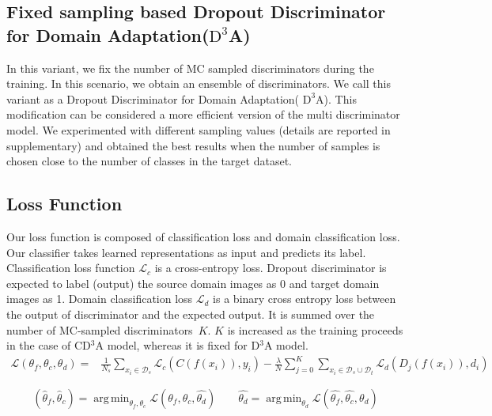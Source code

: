 \documentclass{bmvc2k}
\DeclareMathOperator*{\argmin}{arg\,min}
\begin{document}
\subsection{Fixed sampling based Dropout Discriminator for Domain Adaptation($\text{D}^{3}$A)}
In this variant, we fix the number of MC sampled discriminators during the training. In this scenario, we obtain an ensemble of discriminators. We call this variant as a Dropout Discriminator for Domain Adaptation( $\text{D}^{3}$A). This modification can be considered a more efficient version of the multi discriminator model. We experimented with different sampling values (details are reported in supplementary) and obtained the best results when the number of samples is chosen close to the number of classes in the target dataset. 










 


\subsection{Loss Function}
Our loss function is composed of classification loss and domain classification loss. Our classifier takes learned representations as input and predicts its label.  Classification loss function $\mathcal{L}_c$ is a cross-entropy loss. Dropout discriminator is expected to label (output) the source domain images as 0 and target domain images as 1. Domain classification loss $\mathcal{L}_d$ is a binary cross entropy loss between the output of discriminator and the expected output. It is summed over the number of MC-sampled discriminators~$K$.  $K$ is increased as the training proceeds in the case of CD$^3$A model, whereas it is fixed for D$^3$A model. 
\begin{equation}
\begin{split}
\mathcal{L}(\theta_f,\theta_c, \theta_d) = & \frac{1}{N_s}\sum_{x_i \in \mathcal{D}_s} \mathcal{L}_c(C(f(x_i)),y_i)   - \frac{\lambda}{N}\sum_{j=0}^{K} \sum_{x_i \in \mathcal{D}_s \cup \mathcal{D}_t} \mathcal{L}_d(D_j(f(x_i)),d_i)
\end{split}
\end{equation} 


\begin{equation}
    (\hat{\theta}_f,\hat{\theta}_c)= \argmin_{\theta_f,\theta_c}  \mathcal{L}(\theta_f,\theta_c,\hat{\theta_d})  \hspace{2em}  \hat{\theta_d}= \argmin_{\theta_d} \mathcal{L}(\hat{\theta_f},\hat{\theta_c},\theta_d)
\end{equation}
\end{document}
